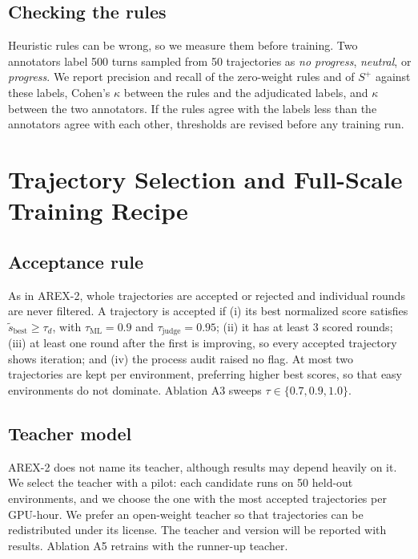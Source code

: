 \documentclass[11pt]{article}
\newcommand{\stilde}{\tilde{s}}
\newcommand{\splus}{S^{+}}
\begin{document}
\subsection{Checking the rules}
Heuristic rules can be wrong, so we measure them before training. Two annotators label 500 turns sampled from 50 trajectories as \emph{no progress}, \emph{neutral}, or \emph{progress}. We report precision and recall of the zero-weight rules and of $\splus$ against these labels, Cohen's $\kappa$ between the rules and the adjudicated labels, and $\kappa$ between the two annotators. If the rules agree with the labels less than the annotators agree with each other, thresholds are revised before any training run.

\section{Trajectory Selection and Full-Scale Training Recipe}
\label{sec:recipe}

\subsection{Acceptance rule}
\label{sec:accept}
As in AREX-2, whole trajectories are accepted or rejected and individual rounds are never filtered. A trajectory is accepted if (i) its best normalized score satisfies $\stilde_{\text{best}} \ge \tau_d$, with $\tau_{\text{ML}} = 0.9$ and $\tau_{\text{judge}} = 0.95$; (ii) it has at least 3 scored rounds; (iii) at least one round after the first is improving, so every accepted trajectory shows iteration; and (iv) the process audit raised no flag. At most two trajectories are kept per environment, preferring higher best scores, so that easy environments do not dominate. Ablation A3 sweeps $\tau \in \{0.7, 0.9, 1.0\}$.

\subsection{Teacher model}
\label{sec:teacher}
AREX-2 does not name its teacher, although results may depend heavily on it. We select the teacher with a pilot: each candidate runs on 50 held-out environments, and we choose the one with the most accepted trajectories per GPU-hour. We prefer an open-weight teacher so that trajectories can be redistributed under its license. The teacher and version will be reported with results. Ablation A5 retrains with the runner-up teacher.
\end{document}
